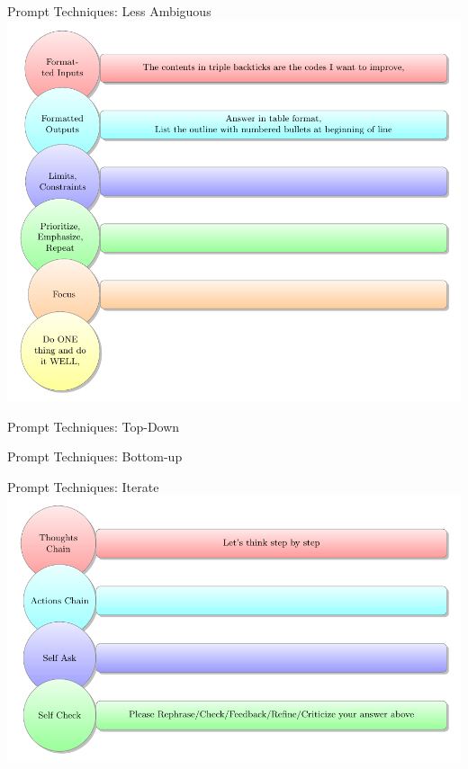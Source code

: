 \documentclass{beamer}
\begin{document}
\begin{frame}{Prompt Techniques: Less Ambiguous}
  \centering
  \includegraphics[width=\linewidth,height=0.8\textheight,keepaspectratio]{./tikz-prompt-techniques-less-ambiguous.pdf}
\end{frame}

\begin{frame}{Prompt Techniques: Top-Down}
  \centering
\end{frame}

\begin{frame}{Prompt Techniques: Bottom-up}
  \centering
\end{frame}

\begin{frame}{Prompt Techniques: Iterate}
  \centering
  \includegraphics[width=\linewidth,height=0.8\textheight,keepaspectratio]{./tikz-prompt-techniques-iterate.pdf}
\end{frame}
\end{document}
